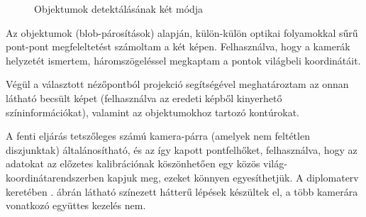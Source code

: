 \begin{figure}[tbh]

\caption{Objektumok detektálásának két módja \label{fig:plan-objects}}
\end{figure}


Az objektumok (blob-párosítások) alapján, külön-külön optikai folyamokkal sűrű pont-pont megfeleltetést számoltam a két képen. Felhasználva, hogy a kamerák helyzetét ismertem, háromszögeléssel megkaptam a pontok világbeli koordinátáit.

Végül a választott nézőpontból projekció segítségével meghatároztam az onnan látható becsült képet (felhasználva az eredeti képből kinyerhető színinformációkat), valamint az objektumokhoz tartozó kontúrokat.

A fenti eljárás tetszőleges számú kamera-párra (amelyek nem feltétlen diszjunktak) általánosítható, és az így kapott pontfelhőket, felhasználva, hogy az adatokat az előzetes kalibrációnak köszönhetően egy közös világ-koordinátarendszerben kapjuk meg, ezeket könnyen egyesíthetjük. A diplomaterv keretében . ábrán látható színezett hátterű lépések készültek el, a több kamerára vonatkozó együttes kezelés nem.

